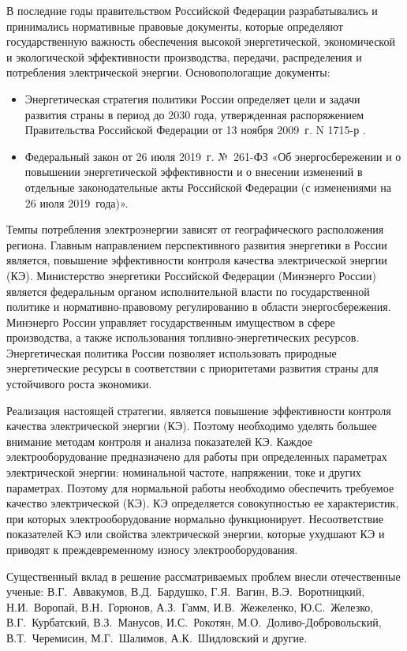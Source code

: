 В последние годы правительством Российской Федерации разрабатывались и принимались нормативные правовые документы, которые
определяют государственную важность обеспечения высокой
энергетической, экономической и экологической эффективности производства,
передачи, распределения и потребления электрической энергии. Основопологащие документы:
\begin{itemize}
	\item Энергетическая стратегия политики России определяет цели и задачи развития страны в период до 2030 года, утвержденная распоряжением Правительства Российской Федерации от 13 ноября 2009~г. N 1715-р \cite{energy_strategy}. 
	\item Федеральный закон от 26 июля 2019~г. №~261-ФЗ «Об энергосбережении и о повышении энергетической эффективности и о внесении изменений в отдельные законодательные акты Российской Федерации (с изменениями на 26 июля 2019~года)»\cite{energy_saving_law_2019}.
\end{itemize}


Темпы потребления электроэнергии зависят от географического расположения региона. Главным направлением перспективного развития энергетики в России является, повышение эффективности контроля качества электрической энергии (КЭ). 
Министерство энергетики Российской Федерации (Минэнерго России) является федеральным органом исполнительной власти по государственной политике и нормативно-правовому регулированию в области энергосбережения. Минэнерго России управляет государственным имуществом в сфере производства, а также использования топливно-энергетических ресурсов. Энергетическая политика России позволяет использовать природные энергетические ресурсы в соответствии с приоритетами развития страны для устойчивого роста экономики. 

Реализация настоящей стратегии, является повышение эффективности 
контроля качества электрической энергии (КЭ). Поэтому необходимо уделять большее внимание методам контроля и анализа показателей КЭ. 
Каждое электрооборудование предназначено для работы при определенных параметрах электрической энергии: номинальной частоте, напряжении, токе и других параметрах. Поэтому для нормальной работы необходимо обеспечить требуемое качество электрической (КЭ).  КЭ определяется совокупностью ее характеристик, при которых электрооборудование нормально функционирует. Несоответствие показателей КЭ или свойства электрической энергии, которые ухудшают КЭ и приводят к преждевременному износу электрооборудования. 

Существенный вклад в решение рассматриваемых проблем внесли отечественные ученые: В.Г.~Аввакумов, В.Д.~Бардушко, Г.Я.~Вагин, В.Э.~Воротницкий, Н.И.~Воропай, В.Н.~Горюнов, А.З.~Гамм, И.В.~Жежеленко, Ю.С.~Железко, В.Г.~Курбатский, В.З.~Манусов, И.С.~Рокотян, М.О.~Доливо-Добровольский, В.Т.~Черемисин, М.Г.~Шалимов, А.К.~Шидловский и другие. 

